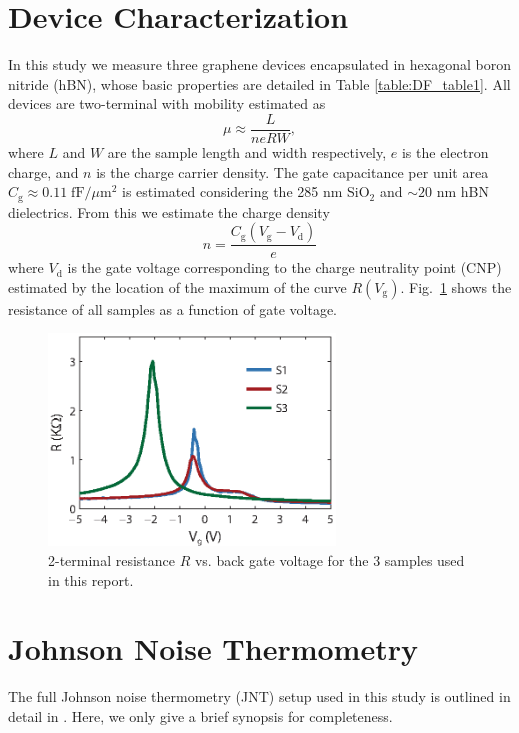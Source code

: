 \section{Device Characterization}
In this study we measure three graphene devices encapsulated in hexagonal boron nitride (hBN), whose basic properties are detailed in Table \ref{table:DF_table1}.    All devices are two-terminal with mobility estimated as \begin{equation}
\mu\approx \frac{L}{neRW},
\end{equation}
where $L$ and $W$ are the sample length and width respectively, $e$ is the electron charge, and $n$ is the charge carrier density.   The gate capacitance per unit area $C_{\mathrm{g}}\approx 0.11\; \mathrm{fF}/\mu \mathrm{m}^2$ is estimated considering the 285 nm SiO$_2$ and $\sim 20$ nm hBN dielectrics.   From this we estimate the charge density \begin{equation}
n=\frac{C_{\mathrm{g}}(V_{\mathrm{g}}-V_{\mathrm{d}})}{e}
\end{equation} where $V_{\mathrm{d}}$ is the gate voltage corresponding to the charge neutrality point (CNP) estimated by the location of the maximum of the curve $R(V_{\mathrm{g}})$.   Fig.~\ref{fig:DF_S1} shows the resistance of all samples as a function of gate voltage.

 \begin{figure}[t]
\includegraphics[width=3in]{figures/Dirac_fluid/S1.eps}
\caption{2-terminal resistance $R$ vs. back gate voltage for the 3 samples used in this report.}
\label{fig:DF_S1}
\end{figure}

\section{Johnson Noise Thermometry}
The full Johnson noise thermometry (JNT) setup used in this study is outlined in detail in \cite{crossno_development_2015}.   Here, we only give a brief synopsis for completeness.

